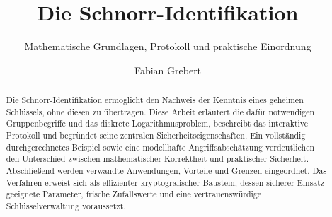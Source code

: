 \documentclass[11pt,a4paper]{scrartcl}
\title{Die Schnorr-Identifikation}
\subtitle{Mathematische Grundlagen, Protokoll und praktische Einordnung}
\author{Fabian Grebert}
\date{}
\begin{document}
\maketitle
\begin{abstract}
Die Schnorr-Identifikation ermöglicht den Nachweis der Kenntnis eines geheimen Schlüssels, ohne diesen zu übertragen. Diese Arbeit erläutert die dafür notwendigen Gruppenbegriffe und das diskrete Logarithmusproblem, beschreibt das interaktive Protokoll und begründet seine zentralen Sicherheitseigenschaften. Ein vollständig durchgerechnetes Beispiel sowie eine modellhafte Angriffsabschätzung verdeutlichen den Unterschied zwischen mathematischer Korrektheit und praktischer Sicherheit. Abschließend werden verwandte Anwendungen, Vorteile und Grenzen eingeordnet. Das Verfahren erweist sich als effizienter kryptografischer Baustein, dessen sicherer Einsatz geeignete Parameter, frische Zufallswerte und eine vertrauenswürdige Schlüsselverwaltung voraussetzt.
\end{abstract}
\tableofcontents
\clearpage

\clearpage







\end{document}
